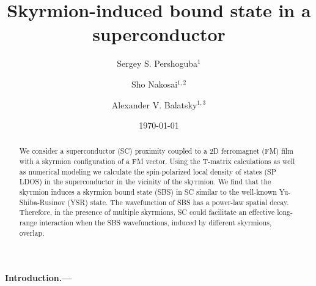 \documentclass[twocolumn,showpacs,floatfix,longbibliography]{revtex4-1}
\begin{document}
\title{Skyrmion-induced bound state in a superconductor}

\author{Sergey S. Pershoguba$^{1}$}
\author{Sho Nakosai$^{1,2}$}
\author{Alexander V. Balatsky$^{1,3}$}

\date{\today}


\begin{abstract}
We consider a superconductor (SC) proximity coupled to a 2D ferromagnet (FM) film with a skyrmion configuration of a FM vector. Using the T-matrix calculations as well as numerical modeling we calculate the spin-polarized local density of states (SP LDOS) in the superconductor in the vicinity of the skyrmion. We find that the skyrmion induces a skyrmion bound state (SBS) in SC similar to the well-known Yu-Shiba-Rusinov (YSR) state. The wavefunction of SBS has a power-law spatial decay. Therefore, in the presence of multiple skyrmions, SC could facilitate an effective long-range interaction when the SBS wavefunctions, induced by different skyrmions, overlap.
\end{abstract}

\pacs{ }   


\maketitle
\paragraph*{Introduction.---} \label{sec:intro}
\end{document}
